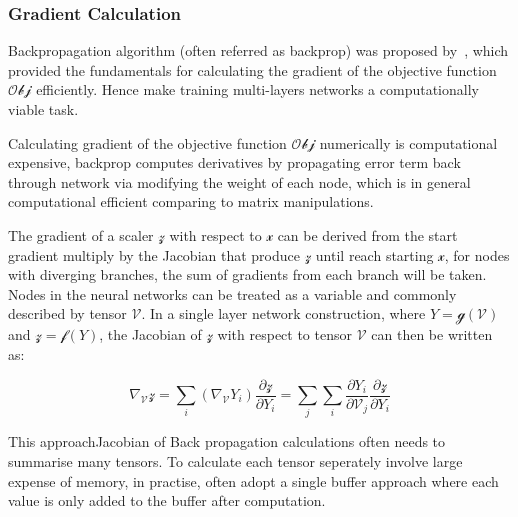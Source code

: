\subsubsection{Gradient Calculation}
Backpropagation algorithm (often referred as backprop) was proposed by~\citet{werbos1975beyond}, which provided the fundamentals for calculating the gradient of the objective function $\mathcal{Obj}$ efficiently. Hence make training multi-layers networks a computationally viable task. 
\par
Calculating gradient of the objective function $\mathcal{Obj}$ numerically is computational expensive, backprop computes derivatives by propagating error term back through network via modifying the weight of each node, which is in general computational efficient comparing to matrix manipulations. 
\par
The gradient of a scaler $\mathcal{z}$ with respect to $\mathcal{x}$ can be derived from the start gradient multiply by the Jacobian that produce $\mathcal{z}$ until reach starting $\mathcal{x}$, for nodes with diverging branches, the sum of gradients from each branch will be taken. Nodes in the neural networks can be treated as a variable and commonly described by tensor $\mathcal{V}$. In a single layer network construction, where $Y=\mathcal{g}(\mathcal{V})$ and $\mathcal{z} = \mathcal{f}(Y)$, the Jacobian of $\mathcal{z}$ with respect to tensor $\mathcal{V}$ can then be written as:

\begin{equation}
    \nabla_{\mathcal{V}}\mathcal{z} = \sum_i (\nabla_{\mathcal{\mathcal{V}}} Y_i)\frac{\partial\mathcal{z}}{\partial Y_i} = \sum_j \sum_i \frac{\partial Y_i} {\partial{\mathcal{V}}_j}\frac{\partial\mathcal{z}}{\partial Y_i}
\end{equation}

This approachJacobian of 
Back propagation calculations often needs to summarise many tensors. To calculate each tensor seperately involve large expense of memory, in practise, often adopt a single buffer approach where each value is only added to the buffer after computation.